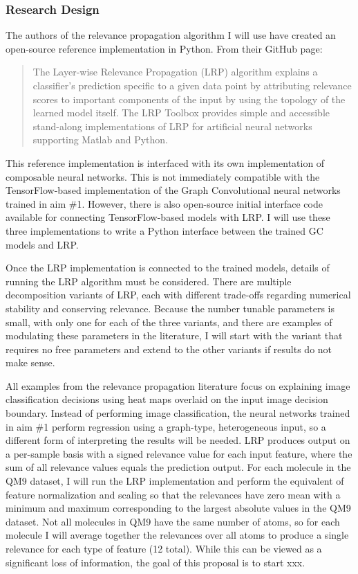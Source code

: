 \documentclass[12pt]{article}
\begin{document}
\subsubsection{Research Design}
\label{sec:orgaed8031}

The authors of the relevance propagation algorithm I will use have created an open-source reference implementation in Python. From their GitHub page\cite{github:lrp}:

\begin{quote}
The Layer-wise Relevance Propagation (LRP) algorithm explains a classifier's prediction specific to a given data point by attributing relevance scores to important components of the input by using the topology of the learned model itself. The LRP Toolbox provides simple and accessible stand-along implementations of LRP for artificial neural networks supporting Matlab and Python.
\end{quote}

This reference implementation is interfaced with its own implementation of composable neural networks. This is not immediately compatible with the TensorFlow-based implementation of the Graph Convolutional neural networks trained in aim \#1. However, there is also open-source initial interface code available for connecting TensorFlow-based models with LRP\cite{github:lrp_tf,github:lrp_tf2}. I will use these three implementations to write a Python interface between the trained GC models and LRP.

Once the LRP implementation is connected to the trained models, details of running the LRP algorithm must be considered. There are multiple decomposition variants of LRP, each with different trade-offs regarding numerical stability and conserving relevance\cite{Binder2016}. Because the number tunable parameters is small, with only one for each of the three variants, and there are examples of modulating these parameters in the literature, I will start with the variant that requires no free parameters and extend to the other variants if results do not make sense.

All examples from the relevance propagation literature focus on explaining image classification decisions using heat maps overlaid on the input image decision boundary. Instead of performing image classification, the neural networks trained in aim \#1 perform regression using a graph-type, heterogeneous input, so a different form of interpreting the results will be needed. LRP produces output on a per-sample basis with a signed relevance value for each input feature, where the sum of all relevance values equals the prediction output. For each molecule in the QM9 dataset, I will run the LRP implementation and perform the equivalent of feature normalization and scaling so that the relevances have zero mean with a minimum and maximum corresponding to the largest absolute values in the QM9 dataset. Not all molecules in QM9 have the same number of atoms, so for each molecule I will average together the relevances over all atoms to produce a single relevance for each type of feature (12 total). While this can be viewed as a significant loss of information, the goal of this proposal is to start xxx.
\end{document}

